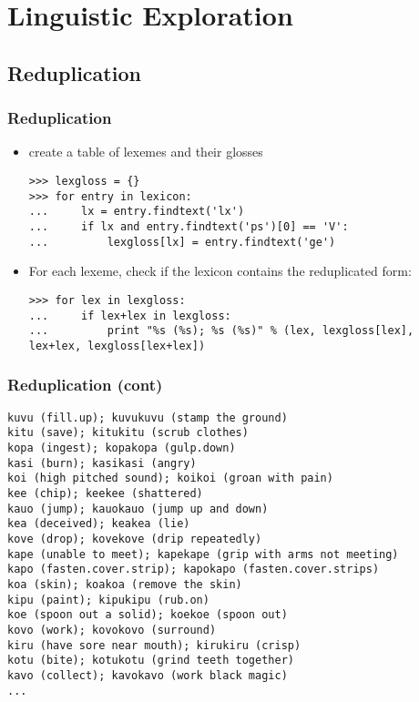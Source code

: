 \documentclass{beamer}             %
\begin{document}
\section{Linguistic Exploration}

\subsection{Reduplication}

\begin{frame}[fragile]
\frametitle{Reduplication}
\scriptsize
\begin{itemize}
\item create a table of lexemes and their glosses

\begin{verbatim}
>>> lexgloss = {}
>>> for entry in lexicon:
...     lx = entry.findtext('lx')
...     if lx and entry.findtext('ps')[0] == 'V':
...         lexgloss[lx] = entry.findtext('ge')
\end{verbatim}

\item For each lexeme, check if the lexicon contains the reduplicated form:

\begin{verbatim}
>>> for lex in lexgloss:
...     if lex+lex in lexgloss:
...         print "%s (%s); %s (%s)" % (lex, lexgloss[lex], lex+lex, lexgloss[lex+lex])
\end{verbatim}
\end{itemize}
\end{frame}

\begin{frame}[fragile]
\frametitle{Reduplication (cont)}
\scriptsize
\begin{verbatim}
kuvu (fill.up); kuvukuvu (stamp the ground)
kitu (save); kitukitu (scrub clothes)
kopa (ingest); kopakopa (gulp.down)
kasi (burn); kasikasi (angry)
koi (high pitched sound); koikoi (groan with pain)
kee (chip); keekee (shattered)
kauo (jump); kauokauo (jump up and down)
kea (deceived); keakea (lie)
kove (drop); kovekove (drip repeatedly)
kape (unable to meet); kapekape (grip with arms not meeting)
kapo (fasten.cover.strip); kapokapo (fasten.cover.strips)
koa (skin); koakoa (remove the skin)
kipu (paint); kipukipu (rub.on)
koe (spoon out a solid); koekoe (spoon out)
kovo (work); kovokovo (surround)
kiru (have sore near mouth); kirukiru (crisp)
kotu (bite); kotukotu (grind teeth together)
kavo (collect); kavokavo (work black magic)
...
\end{verbatim}
\end{frame}
\end{document}
